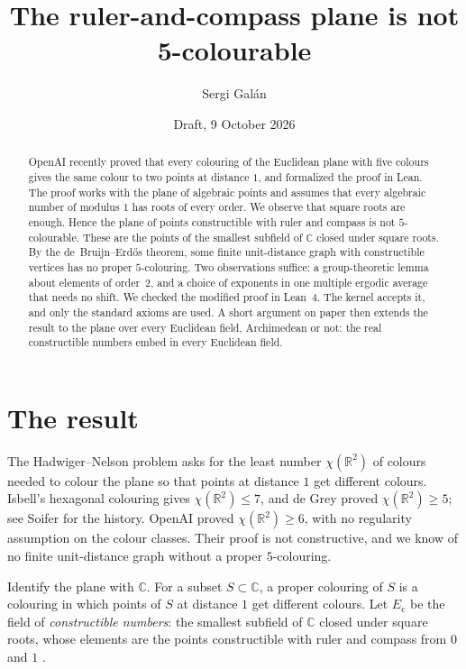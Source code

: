 \documentclass[11pt,a4paper]{amsart}
\title{The ruler-and-compass plane is not 5-colourable}
\author{Sergi Gal\'an}
\date{Draft, 9 October 2026}
\theoremstyle{remark}
\newcommand{\C}{\mathbb{C}}
\newcommand{\R}{\mathbb{R}}
\newcommand{\Ec}{E_{\mathrm{c}}}
\begin{document}
\begin{abstract}
OpenAI recently proved that every colouring of the Euclidean plane with five colours gives the same colour to two
points at distance $1$, and formalized the proof in Lean. The proof works with the plane of algebraic points and
assumes that every algebraic number of modulus $1$ has roots of every order. We observe that square roots are
enough. Hence the plane of points constructible with ruler and compass is not $5$-colourable. These are the points
of the smallest subfield of $\C$ closed under square roots. By the de~Bruijn--Erd\H{o}s theorem, some finite
unit-distance graph with constructible vertices has no proper $5$-colouring. Two observations suffice: a
group-theoretic lemma about elements of order~$2$, and a choice of exponents in one multiple ergodic average that
needs no shift. We checked the modified proof in Lean~4. The kernel accepts it, and only the standard axioms are
used. A short argument on paper then extends the result to the plane over every Euclidean field, Archimedean or
not: the real constructible numbers embed in every Euclidean field.
\end{abstract}

\maketitle

\section{The result}

The Hadwiger--Nelson problem asks for the least number $\chi(\R^2)$ of colours needed to colour the plane so that
points at distance $1$ get different colours. Isbell's hexagonal colouring gives $\chi(\R^2)\le7$, and de Grey
\cite{deGrey} proved $\chi(\R^2)\ge5$; see Soifer \cite{Soifer} for the history. OpenAI \cite{OpenAI} proved
$\chi(\R^2)\ge6$, with no regularity assumption on the colour classes. Their proof is not constructive, and we know
of no finite unit-distance graph without a proper $5$-colouring.

Identify the plane with $\C$. For a subset $S\subset\C$, a proper colouring of $S$ is a colouring in which points of
$S$ at distance $1$ get different colours. Let $\Ec$ be the field of \emph{constructible numbers}: the smallest
subfield of $\C$ closed under square roots, whose elements are the points constructible with ruler and compass from
$0$ and $1$ \cite[Ch.~10]{Cox}.
\end{document}
